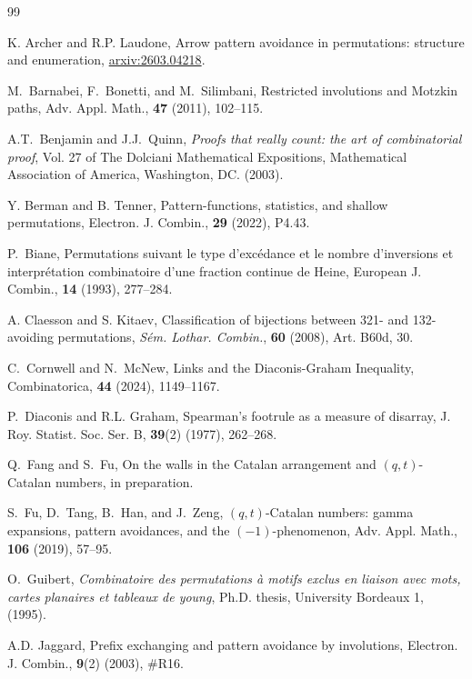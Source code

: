\documentclass[12pt]{amsart}
\numberwithin{equation}{section}
\theoremstyle{plain}
\begin{document}
	\begin{thebibliography}{99}
		
		 K. Archer and R.P. Laudone, Arrow pattern avoidance in permutations: structure and enumeration, \href{https://arxiv.org/abs/2603.04218}{arxiv:2603.04218}.

		 M.~Barnabei, F.~Bonetti, and M.~Silimbani, Restricted involutions and Motzkin paths, Adv. Appl. Math., {\bf47} (2011), 102--115.

		 A.T.~Benjamin and J.J.~Quinn, {\it Proofs that really count: the art of combinatorial proof}, Vol. 27 of The Dolciani Mathematical Expositions, Mathematical Association of America, Washington, DC. (2003).

		 Y. Berman and B. Tenner, Pattern-functions, statistics, and shallow permutations, Electron. J. Combin., {\bf29} (2022), P4.43.

		 P.~Biane, Permutations suivant le type d'exc\'edance et le nombre d'inversions et interpr\'etation combinatoire d'une fraction continue de Heine, European J. Combin., {\bf14} (1993), 277--284.

		 A. Claesson and S. Kitaev, Classification of bijections between 321- and 132-avoiding permutations, {\it S\'em. Lothar. Combin.}, {\bf60} (2008), Art. B60d, 30.

		 C.~Cornwell and N.~McNew, Links and the Diaconis-Graham Inequality, Combinatorica, {\bf44} (2024), 1149--1167.

		 P.~Diaconis and R.L. Graham, Spearman's footrule as a measure of disarray, J. Roy. Statist. Soc. Ser. B, {\bf39}(2) (1977), 262--268.

		 Q.~Fang and S.~Fu, On the walls in the Catalan arrangement and $(q,t)$-Catalan numbers, in preparation.

		 S.~Fu, D.~Tang, B.~Han, and J.~Zeng, $(q,t)$-Catalan numbers: gamma expansions, pattern avoidances, and the $(-1)$-phenomenon, Adv. Appl. Math., {\bf106} (2019), 57--95.

		 O.~Guibert, {\it Combinatoire des permutations \`a motifs exclus en liaison avec mots, cartes planaires et tableaux de young}, Ph.D. thesis, University Bordeaux 1, (1995).

		 A.D. Jaggard, Prefix exchanging and pattern avoidance by involutions, Electron. J. Combin., {\bf9}(2) (2003), \#R16.


\end{thebibliography}
\end{document}
